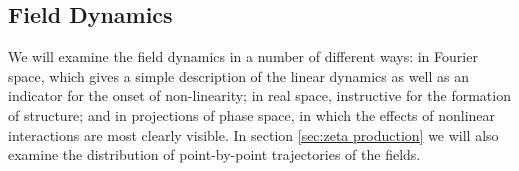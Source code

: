 \subsection{Field Dynamics} \label{sec:field dynanics}




We will examine the field dynamics in a number of different ways:
in Fourier space, which gives a simple description of the linear dynamics as well as an indicator for the onset of non-linearity;
in real space, instructive for the formation of structure;
and in projections of phase space, in which the effects of nonlinear interactions are most clearly visible. 
In section \ref{sec:zeta production} we will also examine the distribution of point-by-point trajectories of the fields.

